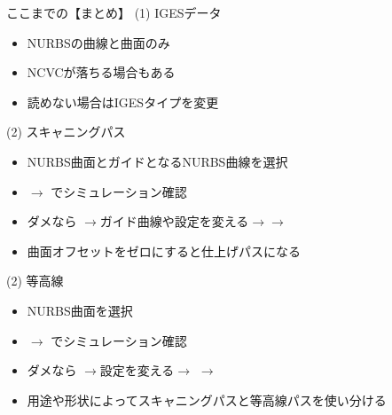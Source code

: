 \newpage
\begin{itembox}[l]{ここまでの【まとめ】}
(1) IGESデータ
\begin{itemize}
\item NURBSの曲線と曲面のみ
\item NCVCが落ちる場合もある
\item 読めない場合はIGESタイプを変更
\end{itemize}
(2) スキャニングパス
\begin{itemize}
\item NURBS曲面とガイドとなるNURBS曲線を選択
\item {}$\rightarrow$ でシミュレーション確認
\item ダメなら  $\rightarrow$ガイド曲線や設定を変える$\rightarrow$$\rightarrow$
\item 曲面オフセットをゼロにすると仕上げパスになる
\end{itemize}
(2) 等高線
\begin{itemize}
\item NURBS曲面を選択
\item {}$\rightarrow$ でシミュレーション確認
\item ダメなら  $\rightarrow$設定を変える$\rightarrow$ $\rightarrow$
\item 用途や形状によってスキャニングパスと等高線パスを使い分ける
\end{itemize}
\end{itembox}
